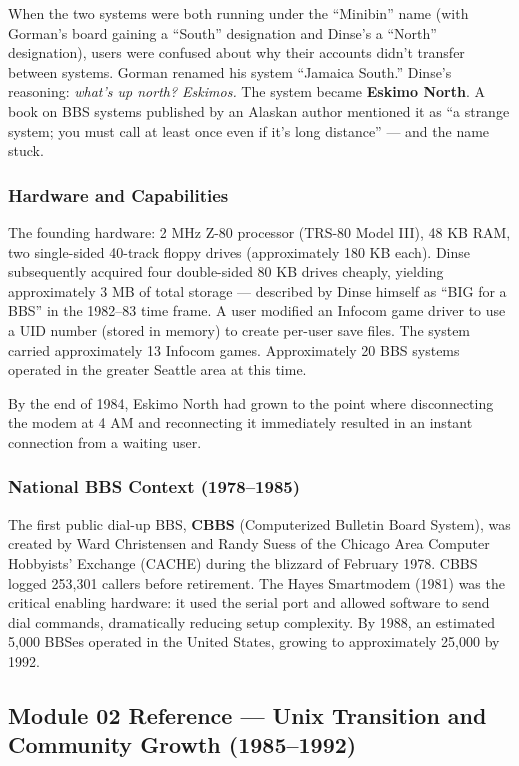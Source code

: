 \documentclass[11pt,letterpaper]{article}
\begin{document}
When the two systems were both running under the ``Minibin'' name (with Gorman's board gaining a ``South'' designation and Dinse's a ``North'' designation), users were confused about why their accounts didn't transfer between systems. Gorman renamed his system ``Jamaica South.'' Dinse's reasoning: \textit{what's up north? Eskimos.} The system became \textbf{Eskimo North}. A book on BBS systems published by an Alaskan author mentioned it as ``a strange system; you must call at least once even if it's long distance'' --- and the name stuck.

\subsubsection{Hardware and Capabilities}

The founding hardware: 2 MHz Z-80 processor (TRS-80 Model III), 48 KB RAM, two single-sided 40-track floppy drives (approximately 180 KB each). Dinse subsequently acquired four double-sided 80 KB drives cheaply, yielding approximately 3 MB of total storage --- described by Dinse himself as ``BIG for a BBS'' in the 1982--83 time frame. A user modified an Infocom game driver to use a UID number (stored in memory) to create per-user save files. The system carried approximately 13 Infocom games. Approximately 20 BBS systems operated in the greater Seattle area at this time.

By the end of 1984, Eskimo North had grown to the point where disconnecting the modem at 4 AM and reconnecting it immediately resulted in an instant connection from a waiting user.

\subsubsection{National BBS Context (1978--1985)}

The first public dial-up BBS, \textbf{CBBS} (Computerized Bulletin Board System), was created by Ward Christensen and Randy Suess of the Chicago Area Computer Hobbyists' Exchange (CACHE) during the blizzard of February 1978. CBBS logged 253,301 callers before retirement. The Hayes Smartmodem (1981) was the critical enabling hardware: it used the serial port and allowed software to send dial commands, dramatically reducing setup complexity. By 1988, an estimated 5,000 BBSes operated in the United States, growing to approximately 25,000 by 1992.

\subsection{Module 02 Reference --- Unix Transition and Community Growth (1985--1992)}
\end{document}
